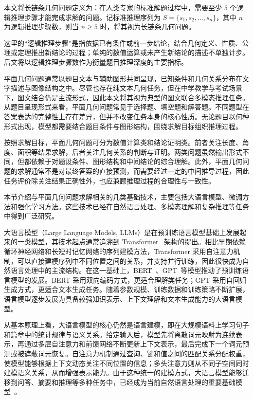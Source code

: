 本文将长链条几何问题定义为：在人类专家的标准解题过程中，需要至少 $5$ 个逻辑推理步骤才能完成求解的问题。记标准推理序列为 $S=\{s_1,s_2,\dots,s_n\}$，其中 $n$ 为逻辑推理步骤数，则当 $n \geq 5$ 时，将其视为长链条几何问题。

这里的“逻辑推理步骤”是指依据已有条件或前一步结论，结合几何定义、性质、公理或定理推出新结论的过程；单纯的数值运算或未产生新结论的描述不单独计步。后文将以逻辑推理步骤数作为衡量题目推理深度的主要指标。


平面几何问题通常以题目文本与辅助图形共同呈现，已知条件和几何关系分布在文字描述与图像结构之中。尽管也存在纯文本几何任务，但在中学教学与考试场景下，图文结合仍是主流形式，因此本文将其视为典型的图文联合多模态推理任务。从题目呈现形式来看，平面几何问题常见于选择题、填空题和解答题。不同题型在答案表达的完整性上存在差异，但并不改变任务本身的核心性质。无论题目以何种形式出现，模型都需要结合题目条件与图形结构，围绕求解目标组织推理过程。

按照求解目标，平面几何问题可分为数值计算类和结论证明类。前者关注长度、角度、面积等结果求解，后者关注几何关系的判断与证明。两类问题虽然输出形式不同，但都依赖于对题设条件、图形结构和中间结论的综合理解。此外，平面几何问题的求解通常不是对最终答案的直接预测，而需要经过一定的中间推导过程，因此任务评价除关注结果正确性外，也应兼顾推理过程的合理性与一致性。


本节介绍与平面几何问题求解相关的几类基础技术，主要包括大语言模型、微调方法和强化学习方法。这些技术已经在自然语言处理、多模态理解和复杂推理等任务中得到广泛研究。


大语言模型（Large Language Models, LLMs）是在预训练语言模型基础上发展起来的一类模型，其技术起点通常追溯到 Transformer ~\cite{vaswani2017attention}架构的提出。相比早期依赖循环神经网络和长短时记忆网络的序列建模方法，Transformer 采用自注意力机制，可以直接建模序列中不同位置之间的关系，并支持并行训练，因此很快成为自然语言处理中的主流结构。在这一基础上，BERT~\cite{devlin2019bert}、GPT~\cite{radford2018gpt}等模型推动了预训练语言模型的发展。BERT 采用双向编码方式，更适合理解类任务；GPT 采用自回归生成方式，更适合文本生成任务。随着参数规模、训练数据和训练策略不断扩展，语言模型逐步发展为具备较强知识表示、上下文理解和文本生成能力的大语言模型。

从基本原理上看，大语言模型的核心仍然是语言建模，即在大规模语料上学习句子和篇章中的统计规律与语义关系。给定输入后，模型先将离散词元映射为连续表示，再通过多层自注意力和前馈网络不断更新上下文表示，最后完成下一个词元预测或被遮蔽词元恢复。自注意力机制通过查询、键和值之间的匹配关系分配权重，使模型能够根据上下文动态关注不同位置的信息；多头注意力则从不同子空间同时建模语义关系，从而增强表示能力。由于这种统一的建模方式，大语言模型能够迁移到问答、摘要和推理等多种任务中，已经成为当前自然语言处理的重要基础模型~\cite{brown2020language}。

